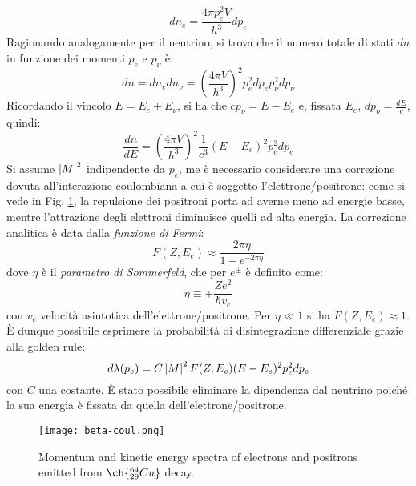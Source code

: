 \begin{equation}
	dn_e = \frac{4\pi p_e^2 V}{h^3} dp_e
	\label{eq:2.26}
\end{equation}
Ragionando analogamente per il neutrino, si trova che il numero totale di stati $ dn $ in funzione dei momenti $ p_e $ e $ p_{\nu} $ è:
\begin{equation}
	dn = dn_e dn_{\nu} = \left( \frac{4\pi V}{h^3} \right)^2 p_e^2 dp_e p_{\nu}^2 dp_{\nu}
	\label{eq:2.27}
\end{equation}
Ricordando il vincolo $ E = E_e + E_{\nu} $, si ha che $ cp_{\nu} = E - E_e $ e, fissata $ E_e $, $ dp_{\nu} = \frac{dE}{c} $, quindi:
\begin{equation}
	\frac{dn}{dE} = \left( \frac{4\pi V}{h^3} \right)^2 \frac{1}{c^3} (E - E_e)^2 p_e^2 dp_e
	\label{eq:2.28}
\end{equation}
Si assume $ \left\lvert M\right\rvert^2 $ indipendente da $ p_e $, me è necessario considerare una correzione dovuta all'interazione coulombiana a cui è soggetto l'elettrone/positrone: come si vede in Fig. \ref{beta-coul}, la repulsione dei positroni porta ad averne meno ad energie basse, mentre l'attrazione degli elettroni diminuisce quelli ad alta energia. La correzione analitica è data dalla \textit{funzione di Fermi}:
\begin{equation}
	F(Z,E_e) \approx \frac{2\pi \eta}{1 - e^{-2\pi \eta}}
	\label{eq:2.29}
\end{equation}
dove $ \eta $ è il \textit{parametro di Sommerfeld}, che per $ e^{\pm} $ è definito come:
\begin{equation}
	\eta \equiv \mp \frac{Ze^2}{\hbar v_e}
	\label{eq:2.30}
\end{equation}
con $ v_e $ velocità asintotica dell'elettrone/positrone. Per $ \eta \ll 1 $ si ha $ F(Z,E_e) \approx 1 $.\\
È dunque possibile esprimere la probabilità di disintegrazione differenziale grazie alla golden rule:
\begin{equation}
	d\lambda(p_e) = C \left\lvert M\right\rvert^2 F(Z,E_e) (E - E_e)^2 p_e^2 dp_e
	\label{eq:2.31}
\end{equation}
con $ C $ una costante. È stato possibile eliminare la dipendenza dal neutrino poiché la sua energia è fissata da quella dell'elettrone/positrone.

\begin{figure}[b!]
	\centering
	\texttt{[image: beta-coul.png]}
	\caption{Momentum and kinetic energy spectra of electrons and positrons emitted from $ \ch{^{64}_{29}Cu} $ decay.}
	\label{beta-coul}
\end{figure}


